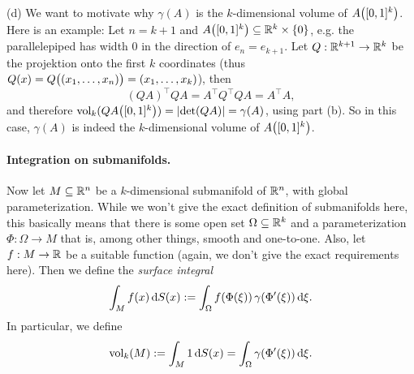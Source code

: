 (d) We want to motivate why $\gamma(A)$ is the $k$-dimensional volume
of $A\bigl([0,1]^{k}\bigr)$. Here is an example: Let $n=k+1$ and
$A\bigl([0,1]^{k}\bigr)\subseteq\mathbb{R}^{k}\times\{0\}$, e.g. the parallelepiped
has width $0$ in the direction of $e_{n}=e_{k+1}$. Let $Q:\mathbb{R}^{k+1}\to\mathbb{R}^{k}$
be the projektion onto the first $k$ coordinates (thus $Q(x)=Q\bigl((x_{1},\ldots,x_{n})\bigr)=(x_{1},\ldots,x_{k})$),
then\[
(QA)^{\top}QA=A^{\top}Q^{\top}QA=A^{\top}A,\]
and therefore $\operatorname{vol}_{k}(QA\bigl([0,1]^{k}\bigr))=\lvert\det(QA)\rvert=\gamma(A)$,
using part (b). So in this case, $\gamma(A)$ is indeed the $k$-dimensional
volume of $A\bigl([0,1]^{k}\bigr)$.

\medskip{}



\paragraph{Integration on submanifolds.}

Now let $M\subseteq\mathbb{R}^{n}$ be a $k$-dimensional submanifold of $\mathbb{R}^{n}$,
with global parameterization. While we won't give the exact definition
of submanifolds here, this basically means that there is some open
set $\Omega\subseteq\mathbb{R}^{k}$ and a parameterization $\Phi:\Omega\to M$
that is, among other things, smooth and one-to-one.
Also, let $f:M\to\mathbb{R}$ be a suitable function (again, we don't give the
exact requirements here). Then we define the \textit{surface integral}\[
\int_{M}f(x)\,\mathrm{d} S(x) := \int_{\Omega}f(\Phi(\xi))\,\gamma(\Phi'(\xi))\,\mathrm{d}\xi.\]
In particular, we define\[
\operatorname{vol}_{k}(M):=\int_{M}1\,\mathrm{d} S(x) =\int_{\Omega}\gamma(\Phi'(\xi))\,\mathrm{d}\xi.\]


